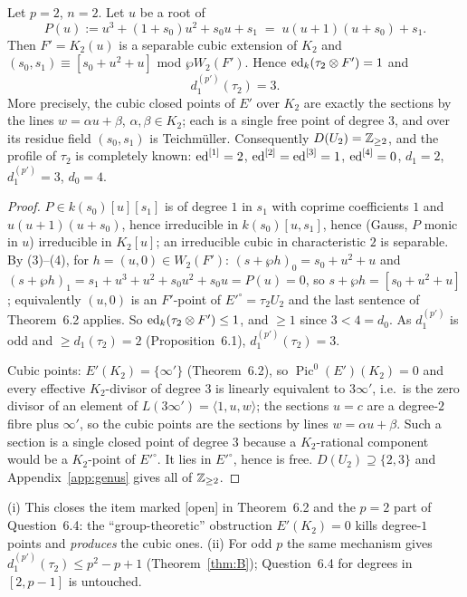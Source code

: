 \begin{theorem}\label{thm:A}
Let $p=2$, $n=2$. Let $u$ be a root of
\[
P(u):=u^3+(1+s_0)u^2+s_0u+s_1\;=\;u(u+1)(u+s_0)+s_1 .
\]
Then $F'=K_2(u)$ is a separable cubic extension of $K_2$ and
$(s_0,s_1)\equiv[s_0+u^2+u]$ mod $\wp W_2(F')$. Hence $\operatorname{ed}_k(\tau_2\otimes F')=1$ and
\[
d_1^{(p')}(\tau_2)=3 .
\]
More precisely, the cubic closed points of $E'$ over $K_2$ are exactly the sections by
the lines $w=\alpha u+\beta$, $\alpha,\beta\in K_2$; each is a single free point of degree
$3$, and over its residue field $(s_0,s_1)$ is Teichm\"uller. Consequently
$D(U_2)=\mathbb Z_{\ge2}$, and the profile of $\tau_2$ is completely known:
$\operatorname{ed}^{[1]}=2$, $\operatorname{ed}^{[2]}=\operatorname{ed}^{[3]}=1$, $\operatorname{ed}^{[4]}=0$, $d_1=2$, $d_1^{(p')}=3$, $d_0=4$.
\end{theorem}

\begin{proof}
$P\in k(s_0)[u][s_1]$ is of degree $1$ in $s_1$ with coprime coefficients $1$ and
$u(u+1)(u+s_0)$, hence irreducible in $k(s_0)[u,s_1]$, hence (Gauss, $P$ monic in $u$)
irreducible in $K_2[u]$; an irreducible cubic in characteristic $2$ is separable. By
(3)--(4), for $h=(u,0)\in W_2(F')$: $(s+\wp h)_0=s_0+u^2+u$ and
$(s+\wp h)_1=s_1+u^3+u^2+s_0u^2+s_0u=P(u)=0$, so $s+\wp h=[s_0+u^2+u]$; equivalently
$(u,0)$ is an $F'$-point of $E'^\circ=\tau_2U_2$ and the last sentence of Theorem~6.2
applies. So $\operatorname{ed}_k(\tau_2\otimes F')\le1$, and $\ge1$ since $3<4=d_0$. As
$d_1^{(p')}$ is odd and $\ge d_1(\tau_2)=2$ (Proposition~6.1), $d_1^{(p')}(\tau_2)=3$.

Cubic points: $E'(K_2)=\{\infty'\}$ (Theorem~6.2), so $\operatorname{Pic}^0(E')(K_2)=0$
and every effective $K_2$-divisor of degree $3$ is linearly equivalent to $3\infty'$,
i.e.\ is the zero divisor of an element of $L(3\infty')=\langle1,u,w\rangle$; the
sections $u=c$ are a degree-$2$ fibre plus $\infty'$, so the cubic points are the
sections by lines $w=\alpha u+\beta$. Such a section is a single closed point of degree
$3$ because a $K_2$-rational component would be a $K_2$-point of $E'^\circ$. It lies in
$E'^\circ$, hence is free. $D(U_2)\supseteq\{2,3\}$ and Appendix~\ref{app:genus} gives
all of $\mathbb Z_{\ge2}$.
\end{proof}

\begin{remark}
(i) This closes the item marked [open] in Theorem~6.2 and the $p=2$ part of
Question~6.4: the ``group-theoretic'' obstruction $E'(K_2)=0$ kills degree-$1$ points and
\emph{produces} the cubic ones. (ii) For odd $p$ the same mechanism gives
$d_1^{(p')}(\tau_2)\le p^2-p+1$ (Theorem~\ref{thm:B}); Question~6.4 for degrees in
$[2,p-1]$ is untouched.
\end{remark}

